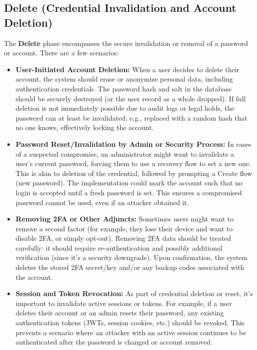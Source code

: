 \documentclass[11pt]{article}
\begin{document}
\subsection{Delete (Credential Invalidation and Account Deletion)}
The \textbf{Delete} phase encompasses the secure invalidation or removal of a password or account. There are a few scenarios:
\begin{itemize}
    \item \textbf{User-Initiated Account Deletion:} When a user decides to delete their account, the system should erase or anonymize personal data, including authentication credentials. The password hash and salt in the database should be securely destroyed (or the user record as a whole dropped). If full deletion is not immediately possible due to audit logs or legal holds, the password can at least be invalidated: e.g., replaced with a random hash that no one knows, effectively locking the account.
    \item \textbf{Password Reset/Invalidation by Admin or Security Process:} In cases of a suspected compromise, an administrator might want to invalidate a user's current password, forcing them to use a recovery flow to set a new one. This is akin to deletion of the credential, followed by prompting a Create flow (new password). The implementation could mark the account such that no login is accepted until a fresh password is set. This ensures a compromised password cannot be used, even if an attacker obtained it.
    \item \textbf{Removing 2FA or Other Adjuncts:} Sometimes users might want to remove a second factor (for example, they lose their device and want to disable 2FA, or simply opt-out). Removing 2FA data should be treated carefully: it should require re-authentication and possibly additional verification (since it's a security downgrade). Upon confirmation, the system deletes the stored 2FA secret/key and/or any backup codes associated with the account.
    \item \textbf{Session and Token Revocation:} As part of credential deletion or reset, it's important to invalidate active sessions or tokens. For example, if a user deletes their account or an admin resets their password, any existing authentication tokens (JWTs, session cookies, etc.) should be revoked. This prevents a scenario where an attacker with an active session continues to be authenticated after the password is changed or account removed.
\end{itemize}
\end{document}
